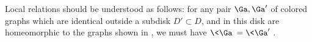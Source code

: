 \begin{theorem}
\begin{enumerate}
    Local relations should be understood as follows: for any pair
    $\Ga, \Ga'$ of colored graphs which are identical outside a subdisk
	$D'\subset D$, and in this disk are homeomorphic to the graphs
    shown in , we must have $\<\Ga\>=\<\Ga'\>$.
   \end{enumerate}

\end{theorem}
